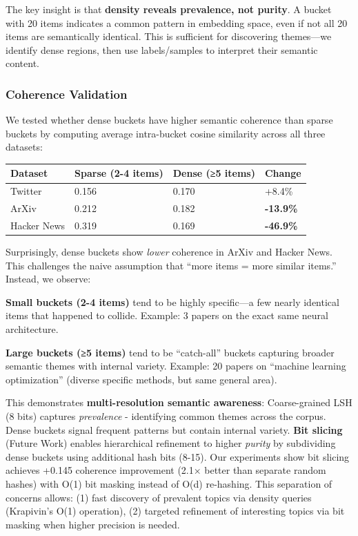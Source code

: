 \documentclass[
]{article}
\begin{document}
The key insight is that \textbf{density reveals prevalence, not purity}.
A bucket with 20 items indicates a common pattern in embedding space,
even if not all 20 items are semantically identical. This is sufficient
for discovering themes---we identify dense regions, then use
labels/samples to interpret their semantic content.

\subsubsection{Coherence Validation}\label{coherence-validation}

We tested whether dense buckets have higher semantic coherence than
sparse buckets by computing average intra-bucket cosine similarity
across all three datasets:

\begin{longtable}[]{@{}llll@{}}
\toprule\noalign{}
Dataset & Sparse (2-4 items) & Dense (≥5 items) & Change \\
\midrule\noalign{}
\endhead
\bottomrule\noalign{}
\endlastfoot
Twitter & 0.156 & 0.170 & +8.4\% \\
ArXiv & 0.212 & 0.182 & \textbf{-13.9\%} \\
Hacker News & 0.319 & 0.169 & \textbf{-46.9\%} \\
\end{longtable}

Surprisingly, dense buckets show \emph{lower} coherence in ArXiv and
Hacker News. This challenges the naive assumption that ``more items =
more similar items.'' Instead, we observe:

\textbf{Small buckets (2-4 items)} tend to be highly specific---a few
nearly identical items that happened to collide. Example: 3 papers on
the exact same neural architecture.

\textbf{Large buckets (≥5 items)} tend to be ``catch-all'' buckets
capturing broader semantic themes with internal variety. Example: 20
papers on ``machine learning optimization'' (diverse specific methods,
but same general area).

This demonstrates \textbf{multi-resolution semantic awareness}:
Coarse-grained LSH (8 bits) captures \emph{prevalence} - identifying
common themes across the corpus. Dense buckets signal frequent patterns
but contain internal variety. \textbf{Bit slicing} (Future Work) enables
hierarchical refinement to higher \emph{purity} by subdividing dense
buckets using additional hash bits (8-15). Our experiments show bit
slicing achieves +0.145 coherence improvement (2.1× better than separate
random hashes) with O(1) bit masking instead of O(d) re-hashing. This
separation of concerns allows: (1) fast discovery of prevalent topics
via density queries (Krapivin's O(1) operation), (2) targeted refinement
of interesting topics via bit masking when higher precision is needed.
\end{document}
